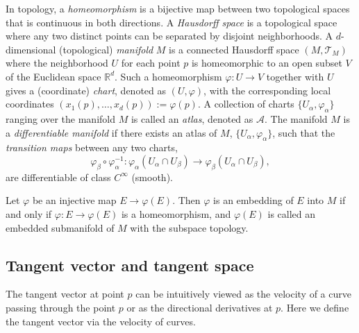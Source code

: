 \documentclass[11pt,a4paper,]{article}
\begin{document}
In topology, a \emph{homeomorphism} is a bijective map between two
topological spaces that is continuous in both directions. A \emph{Hausdorff
space} is a topological space where any two distinct points can be
separated by disjoint neighborhoods. A \(d\)-dimensional (topological)
\emph{manifold} \(M\) is a connected Hausdorff space \((M, \mathcal{T}_M)\) where
the neighborhood \(U\) for each point \(p\) is homeomorphic to an open
subset \(V\) of the Euclidean space \(\mathbb{R}^d\). Such a homeomorphism
\(\varphi: U \rightarrow V\) together with \(U\) gives a (coordinate)
\emph{chart}, denoted as \((U, \varphi)\), with the corresponding local
coordinates \((x_1(p),\dots, x_d(p)) := \varphi(p)\). A collection of
charts \(\{U_\alpha, \varphi_\alpha\}\) ranging over the manifold \(M\) is
called an \emph{atlas}, denoted as \(\mathcal{A}\). The manifold \(M\) is a
\emph{differentiable manifold} if there exists an atlas of \(M\),
\(\{U_\alpha, \varphi_\alpha\}\), such that the \emph{transition maps} between
any two charts, \[
\varphi_\beta \circ \varphi_\alpha^{-1}: \varphi_\alpha(U_\alpha \cap U_\beta) \rightarrow \varphi_\beta(U_\alpha \cap U_\beta),
\] are differentiable of class \(C^\infty\) (smooth).

Let \(\varphi\) be an injective map \(E \rightarrow \varphi(E)\). Then
\(\varphi\) is an embedding of \(E\) into \(M\) if and only if
\(\varphi: E \rightarrow \varphi(E)\) is a homeomorphism, and \(\varphi(E)\)
is called an embedded submanifold of \(M\) with the subspace topology.

\hypertarget{tangent-vector-and-tangent-space}{%
\subsection{Tangent vector and tangent space}\label{tangent-vector-and-tangent-space}}

The tangent vector at point \(p\) can be intuitively viewed as the
velocity of a curve passing through the point \(p\) or as the directional
derivatives at \(p\). Here we define the tangent vector via the velocity
of curves.
\end{document}
